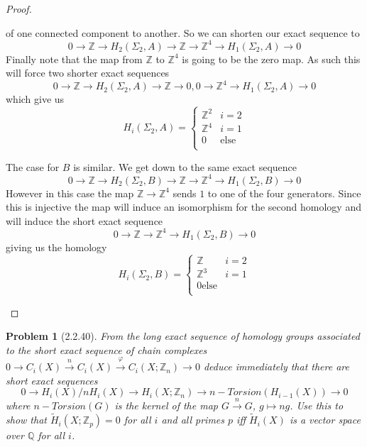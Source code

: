 \documentclass[10pt]{article}
\newcommand{\sk}{\vskip 10mm}
\newcommand{\bb}[1]{\mathbb{#1}}
\newcommand{\rH}{\widetilde{H}}
\theoremstyle{plain}
\newtheorem{problem}{Problem}
\theoremstyle{remark}
\begin{document}
\begin{proof}
\begin{enumerate}
    of one connected component to another. So we can shorten our exact sequence to
    \[
      0 \rightarrow \bb{Z} \rightarrow H_2(\Sigma_2,A)\rightarrow \bb{Z}\rightarrow\bb{Z}^4\rightarrow H_1(\Sigma_2,A)\rightarrow 0
    \]
    Finally note that the map from $\bb{Z}$ to $\bb{Z}^4$ is going to be the zero map.
    As such this will force two shorter exact sequences
    \[
      0\rightarrow \bb{Z} \rightarrow H_2(\Sigma_2,A)\rightarrow \bb{Z}\rightarrow 0 , 0\rightarrow \bb{Z}^4\rightarrow H_1(\Sigma_2,A)\rightarrow 0
    \]
    which give us
    \[
      H_i(\Sigma_2,A) = \left\{
        \begin{array}{lr}
          \bb{Z}^2& i=2\\
          \bb{Z}^4 & i=1\\
          0 & \text{else}\\
        \end{array}
      \right.
    \]

    The case for $B$ is similar. We get down to the same exact sequence
    \[
      0 \rightarrow \bb{Z} \rightarrow H_2(\Sigma_2,B)\rightarrow \bb{Z}\rightarrow\bb{Z}^4\rightarrow H_1(\Sigma_2,B)\rightarrow 0
    \]
    However in this case the map $\bb{Z}\rightarrow\bb{Z}^4$ sends $1$ to
    one of the four generators. Since this is injective the map will induce
    an isomorphism for the second homology and will induce the short exact sequence
    \[
      0 \rightarrow \bb{Z} \rightarrow \bb{Z}^4\rightarrow H_1(\Sigma_2,B) \rightarrow 0
    \]
    giving us the homology
    \[
      H_i(\Sigma_2,B) = \left\{
        \begin{array}{lr}
          \bb{Z}& i=2\\
          \bb{Z}^3 &i=1\\
          0 \text{else}\\
        \end{array}
        \right.
    \]
  \end{enumerate}
\end{proof}

\sk

\begin{problem}[2.2.40]
  From the long exact sequence of homology groups associated to the short
  exact sequence of chain complexes
  $0\rightarrow C_i(X)\xrightarrow{n} C_i(X)\xrightarrow{\varphi} C_i(X;\bb{Z}_n)\rightarrow 0$
  deduce immediately that there are short exact sequences
  \[
    0\rightarrow H_i(X)/nH_i(X)\rightarrow H_i(X;\bb{Z}_n)\rightarrow n-Torsion(H_{i-1}(X))\rightarrow 0
  \]
  where $n-Torsion(G)$ is the kernel of the map $G\xrightarrow{n} G$,
  $g\mapsto ng$. Use this to show that $\rH_i(X;\bb{Z}_p)=0$ for all $i$ and all
  primes $p$ iff $\rH_i(X)$ is a vector space over $\bb{Q}$ for all $i$.
\end{problem}
\end{document}
